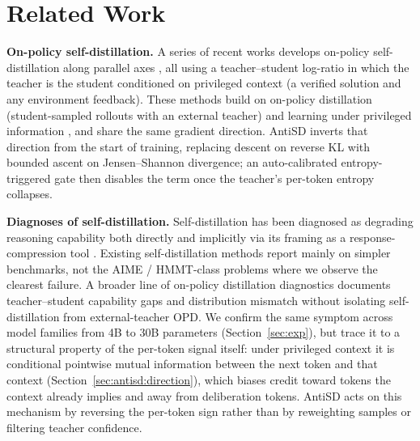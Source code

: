 \documentclass{llmxive}
\begin{document}
\vspace{-0.5em}

\section{Related Work}
\label{sec:related}
\vspace{-0.5em}

\textbf{On-policy self-distillation.}
A series of recent works develops on-policy self-distillation along parallel axes \citep{opsd, sdpo, opcd-ye, opsdc, yang2026rlsd}, all using a teacher--student log-ratio in which the teacher is the student conditioned on privileged context (a verified solution and any environment feedback). These methods build on on-policy distillation \citep{gkd, fu2026revisitingonpolicydistillationempirical} (student-sampled rollouts with an external teacher) and learning under privileged information \citep{vapnik-lupi, lopez2015unifying}, and share the same gradient direction. AntiSD inverts that direction from the start of training, replacing descent on reverse KL with bounded ascent on Jensen--Shannon divergence; an auto-calibrated entropy-triggered gate then disables the term once the teacher's per-token entropy collapses.

\textbf{Diagnoses of self-distillation.}
Self-distillation has been diagnosed as degrading reasoning capability both directly \citep{kim2026does} and implicitly via its framing as a response-compression tool \citep{opsdc}. Existing self-distillation methods \citep{opsd, sdpo, opcd-ye, yang2026rlsd} report mainly on simpler benchmarks, not the AIME / HMMT-class problems where we observe the clearest failure. A broader line of on-policy distillation diagnostics \citep{fu2026revisitingonpolicydistillationempirical, li2026rethinking, li2026unifying, xu2026paceddistillationselfdistillationfrontier} documents teacher--student capability gaps and distribution mismatch without isolating self-distillation from external-teacher OPD. We confirm the same symptom across model families from 4B to 30B parameters (Section~\ref{sec:exp}), but trace it to a structural property of the per-token signal itself: under privileged context it is conditional pointwise mutual information between the next token and that context (Section~\ref{sec:antisd:direction}), which biases credit toward tokens the context already implies and away from deliberation tokens. AntiSD acts on this mechanism by reversing the per-token sign rather than by reweighting samples or filtering teacher confidence.
\end{document}
